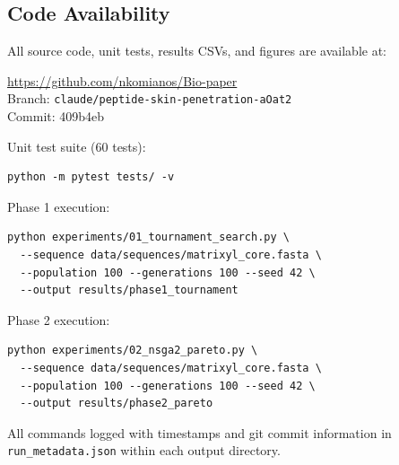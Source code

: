 \documentclass[11pt,a4paper]{article}
\begin{document}
\subsection{Code Availability}

All source code, unit tests, results CSVs, and figures are available at:
\begin{center}
\url{https://github.com/nkomianos/Bio-paper}\\
Branch: \texttt{claude/peptide-skin-penetration-aOat2}\\
Commit: 409b4eb
\end{center}

Unit test suite (60 tests):
\begin{verbatim}
python -m pytest tests/ -v
\end{verbatim}

Phase 1 execution:
\begin{verbatim}
python experiments/01_tournament_search.py \
  --sequence data/sequences/matrixyl_core.fasta \
  --population 100 --generations 100 --seed 42 \
  --output results/phase1_tournament
\end{verbatim}

Phase 2 execution:
\begin{verbatim}
python experiments/02_nsga2_pareto.py \
  --sequence data/sequences/matrixyl_core.fasta \
  --population 100 --generations 100 --seed 42 \
  --output results/phase2_pareto
\end{verbatim}

All commands logged with timestamps and git commit information in \texttt{run\_metadata.json} within each output directory.
\end{document}
